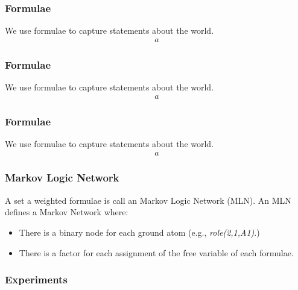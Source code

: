 \documentclass{beamer}
\begin{document}
\begin{frame}
    \frametitle{Formulae}


    We use formulae to capture statements about the world. 
 \begin{eqnarray*}
a
 \end{eqnarray*}


\end{frame}


\begin{frame}
    \frametitle{Formulae}


    We use formulae to capture statements about the world. 
 \begin{eqnarray*}
a
 \end{eqnarray*}


\end{frame}


\begin{frame}
    \frametitle{Formulae}


    We use formulae to capture statements about the world. 
 \begin{eqnarray*}
a
 \end{eqnarray*}


\end{frame}


\begin{frame}
    \frametitle{Markov Logic Network}
    A set a weighted formulae is call an Markov Logic Network (MLN). 
    An MLN defines a Markov Network where:
    \begin{itemize}
    \item There is a binary node for each ground atom (e.g., \emph{role(2,1,A1)}.)
    \item There is a factor for each assignment of the free variable of each formulae. 
    \end{itemize}


\end{frame}


\begin{frame}
    \frametitle{Experiments}
    
\end{frame}
\end{document}
